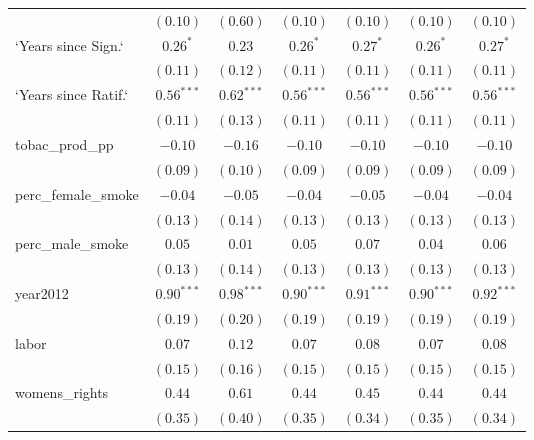 \begin{table}[!h]
\begin{center}
\begin{tabular}{l c c c c c c }
                        & $(0.10)$     & $(0.60)$     & $(0.10)$     & $(0.10)$     & $(0.10)$     & $(0.10)$     \\
`Years since Sign.`     & $0.26^{*}$   & $0.23$       & $0.26^{*}$   & $0.27^{*}$   & $0.26^{*}$   & $0.27^{*}$   \\
                        & $(0.11)$     & $(0.12)$     & $(0.11)$     & $(0.11)$     & $(0.11)$     & $(0.11)$     \\
`Years since Ratif.`    & $0.56^{***}$ & $0.62^{***}$ & $0.56^{***}$ & $0.56^{***}$ & $0.56^{***}$ & $0.56^{***}$ \\
                        & $(0.11)$     & $(0.13)$     & $(0.11)$     & $(0.11)$     & $(0.11)$     & $(0.11)$     \\
tobac\_prod\_pp         & $-0.10$      & $-0.16$      & $-0.10$      & $-0.10$      & $-0.10$      & $-0.10$      \\
                        & $(0.09)$     & $(0.10)$     & $(0.09)$     & $(0.09)$     & $(0.09)$     & $(0.09)$     \\
perc\_female\_smoke     & $-0.04$      & $-0.05$      & $-0.04$      & $-0.05$      & $-0.04$      & $-0.04$      \\
                        & $(0.13)$     & $(0.14)$     & $(0.13)$     & $(0.13)$     & $(0.13)$     & $(0.13)$     \\
perc\_male\_smoke       & $0.05$       & $0.01$       & $0.05$       & $0.07$       & $0.04$       & $0.06$       \\
                        & $(0.13)$     & $(0.14)$     & $(0.13)$     & $(0.13)$     & $(0.13)$     & $(0.13)$     \\
year2012                & $0.90^{***}$ & $0.98^{***}$ & $0.90^{***}$ & $0.91^{***}$ & $0.90^{***}$ & $0.92^{***}$ \\
                        & $(0.19)$     & $(0.20)$     & $(0.19)$     & $(0.19)$     & $(0.19)$     & $(0.19)$     \\
labor                   & $0.07$       & $0.12$       & $0.07$       & $0.08$       & $0.07$       & $0.08$       \\
                        & $(0.15)$     & $(0.16)$     & $(0.15)$     & $(0.15)$     & $(0.15)$     & $(0.15)$     \\
womens\_rights          & $0.44$       & $0.61$       & $0.44$       & $0.45$       & $0.44$       & $0.44$       \\
                        & $(0.35)$     & $(0.40)$     & $(0.35)$     & $(0.34)$     & $(0.35)$     & $(0.34)$     \\

\end{tabular}
\end{center}
\end{table}
